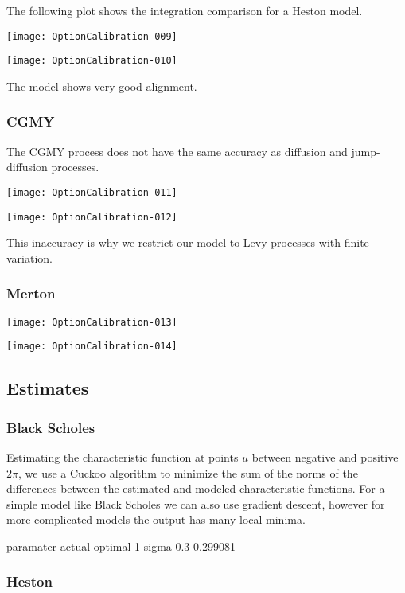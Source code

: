 \documentclass{article}
\begin{document}
The following plot shows the integration comparison for a Heston model.

\texttt{[image: OptionCalibration-009]}

\texttt{[image: OptionCalibration-010]}

The model shows very good alignment.

\subsubsection{CGMY}

The CGMY process does not have the same accuracy as diffusion and jump-diffusion processes.

\texttt{[image: OptionCalibration-011]}

\texttt{[image: OptionCalibration-012]}

This inaccuracy is why we restrict our model to Levy processes with finite variation.  

\subsubsection{Merton}

\texttt{[image: OptionCalibration-013]}

\texttt{[image: OptionCalibration-014]}

\subsection{Estimates}

\subsubsection{Black Scholes}
Estimating the characteristic function at points \(u\) between negative and positive \(2\pi\), we use a Cuckoo algorithm to minimize the sum of the norms of the differences between the estimated and modeled characteristic functions.  For a simple model like Black Scholes we can also use gradient descent, however for more complicated models the output has many local minima.  

\begin{Schunk}
\begin{Soutput}
  paramater actual  optimal
1     sigma    0.3 0.299081
\end{Soutput}
\end{Schunk}

\subsubsection{Heston}
\end{document}

